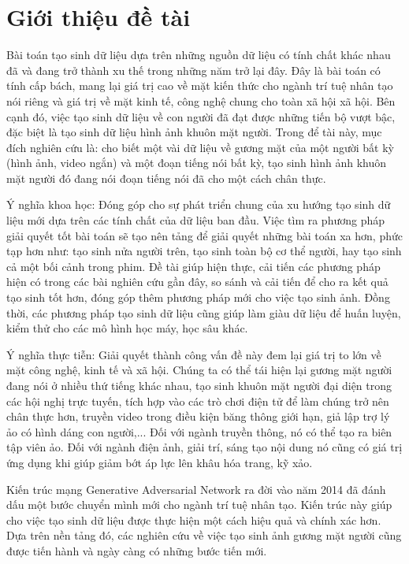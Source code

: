 \section{\texorpdfstring{Giới thiệu đề tài}{Introduce}}
Bài toán tạo sinh dữ liệu dựa trên những nguồn dữ liệu có tính chất khác nhau đã và đang trở thành xu thế trong những năm trở lại đây. Đây là bài toán có tính cấp bách, mang lại giá trị cao về mặt kiến thức cho ngành trí tuệ nhân tạo nói riêng và giá trị về mặt kinh tế, công nghệ chung cho toàn xã hội xã hội. Bên cạnh đó, việc tạo sinh dữ liệu về con người đã đạt được những tiến bộ vượt bậc, đặc biệt là tạo sinh dữ liệu hình ảnh khuôn mặt người. Trong để tài này, mục đích nghiên cứu là: cho biết một vài dữ liệu về gương mặt của một người bất kỳ (hình ảnh, video ngắn) và một đoạn tiếng nói bất kỳ, tạo sinh hình ảnh khuôn mặt người đó đang nói đoạn tiếng nói đã cho một cách chân thực.

Ý nghĩa khoa học: Đóng góp cho sự phát triển chung của xu hướng tạo sinh dữ liệu mới dựa trên các tính chất của dữ liệu ban đầu. Việc tìm ra phương pháp giải quyết tốt bài toán sẽ tạo nên tảng để giải quyết những bài toán xa hơn, phức tạp hơn như: tạo sinh nửa người trên, tạo sinh toàn bộ cơ thể người, hay tạo sinh cả một bối cảnh trong phim. Đề tài giúp hiện thực, cải tiến các phương pháp hiện có trong các bài nghiên cứu gần đây, so sánh và cải tiến để cho ra kết quả tạo sinh tốt hơn, đóng góp thêm phương pháp mới cho việc tạo sinh ảnh. Đồng thời, các phương pháp tạo sinh dữ liệu cũng giúp làm giàu dữ liệu để huấn luyện, kiểm thử cho các mô hình học máy, học sâu khác.

Ý nghĩa thực tiễn: Giải quyết thành công vấn đề này đem lại giá trị to lớn về mặt công nghệ, kinh tế và xã hội. Chúng ta có thể tái hiện lại gương mặt người đang nói ở nhiều thứ tiếng khác nhau, tạo sinh khuôn mặt người đại diện trong các hội nghị trực tuyến, tích hợp vào các trò chơi điện tử để làm chúng trở nên chân thực hơn, truyền video trong điều kiện băng thông giới hạn, giả lập trợ lý ảo có hình dáng con người,... Đối với ngành truyền thông, nó có thể tạo ra biên tập viên ảo. Đối với ngành điện ảnh, giải trí, sáng tạo nội dung nó cũng có giá trị ứng dụng khi giúp giảm bớt áp lực lên khâu hóa trang, kỹ xảo.

Kiến trúc mạng Generative Adversarial Network \cite{gans_base} ra đời vào năm 2014 đã đánh dấu một bước chuyển mình mới cho ngành trí tuệ nhân tạo. Kiến trúc này giúp cho việc tạo sinh dữ liệu được thực hiện một cách hiệu quả và chính xác hơn. Dựa trên nền tảng đó, các nghiên cứu về việc tạo sinh ảnh gương mặt người cũng được tiến hành và ngày càng có những bước tiến mới. 

